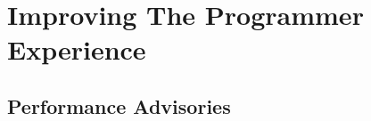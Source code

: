 \section{Improving The Programmer Experience}

\paragraph{}

\subsection{Performance Advisories}
\paragraph{}
\paragraph{}
\paragraph{}
\paragraph{}

